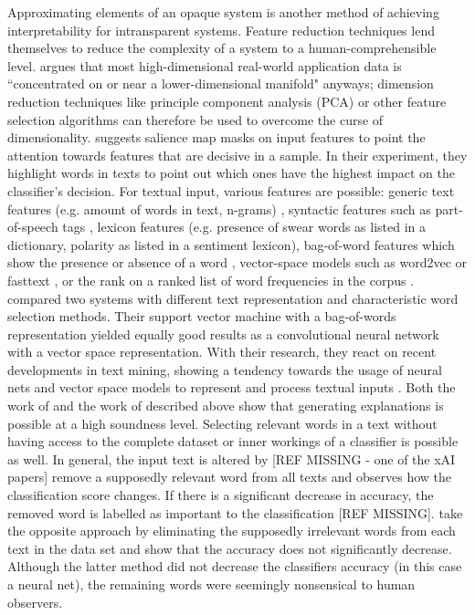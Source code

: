 Approximating elements of an opaque system is another method of achieving interpretability for intransparent systems. Feature reduction techniques lend themselves to reduce the complexity of a system to a human-comprehensible level. \cite{domingos2012few} argues that most high-dimensional real-world application data is ``concentrated on or near a lower-dimensional manifold" anyways; dimension reduction techniques like principle component analysis (PCA) or other feature selection algorithms can therefore be used to overcome the curse of dimensionality. \cite{chen2018learning} suggests salience map masks on input features to point the attention towards features that are decisive in a sample. In their experiment, they highlight words in texts to point out which ones have the highest impact on the classifier's decision. For textual input, various features are possible: generic text features (e.g. amount of words in text, n-grams) \cite{del2017hate}, syntactic features such as part-of-speech tags \cite{del2017hate}, lexicon features (e.g. presence of swear words as listed in a dictionary, polarity as listed in a sentiment lexicon), bag-of-word features which show the presence or absence of a word \cite{arras2017relevant}, vector-space models such as word2vec or fasttext \cite{arras2017relevant, hovelmann2017fasttext}, or the rank on a ranked list of word frequencies in the corpus \cite{chen2018learning}. \cite{arras2017relevant} compared two systems with different text representation and characteristic word selection methods. Their support vector machine with a bag-of-words representation yielded equally good results as a convolutional neural network with a vector space representation. With their research, they react on recent developments in text mining, showing a tendency towards the usage of neural nets and vector space models to represent and process textual inputs \cite{arras2017relevant}. Both the work of \cite{arras2017relevant} and the work of \cite{chen2018learning} described above show that generating explanations is possible at a high soundness level. Selecting relevant words in a text without having access to the complete dataset or inner workings of a classifier is possible as well. In general, the input text is altered by {\color{red}[REF MISSING - one of the xAI papers]} remove a supposedly relevant word from all texts and observes how the classification score changes. If there is a significant decrease in accuracy, the removed word is labelled as important to the classification {\color{red}[REF MISSING]}. \cite{feng2018pathologies} take the opposite approach by eliminating the supposedly irrelevant words from each text in the data set and show that the accuracy does not significantly decrease. Although the latter method did not decrease the classifiers accuracy (in this case a neural net), the remaining words were seemingly nonsensical to human observers.\newline
